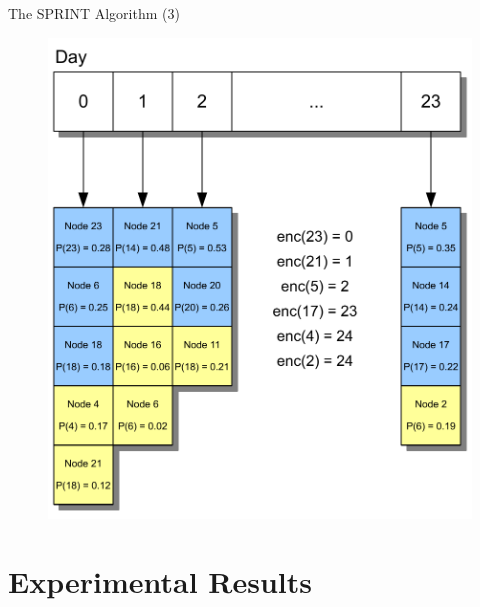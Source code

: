 \documentclass{beamer}
\begin{document}
\begin{frame}{The SPRINT Algorithm (3)}
	\begin{figure}[!t]
		\centering
		\includegraphics[scale=0.4]{img/prediction}
	\end{figure}
\end{frame}

\section{Experimental Results}
\end{document}
